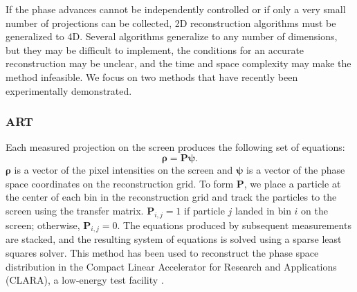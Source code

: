 If the phase advances cannot be independently controlled or if only a very small number of projections can be collected, 2D reconstruction algorithms must be generalized to 4D. Several algorithms generalize to any number of dimensions, but they may be difficult to implement, the conditions for an accurate reconstruction may be unclear, and the time and space complexity may make the method infeasible. We focus on two methods that have recently been experimentally demonstrated.


\subsubsection{ART}

Each measured projection on the screen produces the following set of equations:
%
\begin{equation}\label{eq:art}
    \bm{\rho} = \mathbf{P} \bm{\psi}.
\end{equation}
%
$\bm{\rho}$ is a vector of the pixel intensities on the screen and $\bm{\psi}$ is a vector of the phase space coordinates on the reconstruction grid. To form $\mathbf{P}$, we place a particle at the center of each bin in the reconstruction grid and track the particles to the screen using the transfer matrix. $\mathbf{P}_{i, j} = 1$ if particle $j$ landed in bin $i$ on the screen; otherwise, $\mathbf{P}_{i, j} = 0$. The equations produced by subsequent measurements are stacked, and the resulting system of equations is solved using a sparse least squares solver. This method has been used to reconstruct the phase space distribution in the Compact Linear Accelerator for Research and Applications (CLARA), a low-energy test facility \cite{Wolski2020}.

